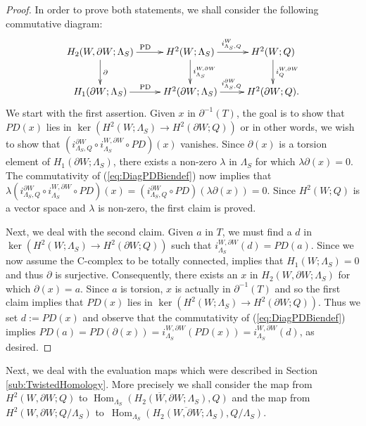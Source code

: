 \documentclass[11pt,a4paper]{amsart}
\theoremstyle{definition}
\DeclareMathOperator{\Hom}{Hom}
\begin{document}
\begin{proof}
In order to prove both statements, we shall consider the following commutative diagram:
\begin{equation}
\label{eq:DiagPDBiendef}
\xymatrix{
H_2(W,\partial W;\Lambda_S) \ar[r]^{\text{PD}} \ar[d]^{\partial}& H^2(W;\Lambda_S) \ar[r]^{i^W_{\Lambda_S,Q}}\ar[d]^{i_{\Lambda_S}^{W,\partial W}}& H^2(W;Q) \ar[d]^{i_Q^{W,\partial W}} \\
H_1(\partial W;\Lambda_S) \ar[r]^{\text{PD}} & H^2(\partial W;\Lambda_S) \ar[r]^{i^{\partial W}_{\Lambda_S,Q}}& H^2(\partial W;Q). \\
}
\end{equation}
We start with the first assertion. Given $x$ in $\partial^{-1}(T)$, the goal is to show that $PD(x)$ lies in $\ker(H^2(W;\Lambda_S) \to H^2(\partial W;Q))$ or in other words, we wish to show that $(i^{\partial W}_{\Lambda_S,Q} \circ  i_{\Lambda_S}^{W,\partial W} \circ PD)(x)$ vanishes. Since $\partial (x)$ is a torsion element of $H_1(\partial W;\Lambda_S)$, there exists a non-zero $\lambda$ in $\Lambda_S$ for which $\lambda \partial (x)=0$. The commutativity of (\ref{eq:DiagPDBiendef}) now implies that $\lambda (i^{\partial W}_{\Lambda_S,Q} \circ i_{\Lambda_S}^{W,\partial W} \circ PD)(x)=(i^{\partial W}_{\Lambda_S,Q} \circ PD)(\lambda \partial( x))=0$. Since $H^2(W;Q)$ is a vector space and $\lambda$ is non-zero, the first claim is proved.

Next, we deal with the second claim. Given $a$ in $T$, we must find a $d$ in $\ker(H^2(W;\Lambda_S) \to H^2(\partial W;Q))$ such that $i_{\Lambda_S}^{W,\partial W}(d)=PD(a)$. Since we now assume the C-complex to be totally connected, \cite[Corollary 3.2]{ConwayFriedlToffoli} implies that $H_1(W;\Lambda_S)=0$ and thus $\partial$ is surjective. Consequently, there exists an $x$ in $H_2(W,\partial W;\Lambda_S)$ for which $\partial (x)=a$. Since $a$ is torsion, $x$ is actually in $\partial^{-1}(T)$ and so the first claim implies that $PD(x)$ lies in $\ker(H^2(W;\Lambda_S) \to H^2(\partial W;Q))$. Thus we set $d:=PD(x)$ and observe that the commutativity of (\ref{eq:DiagPDBiendef}) implies $PD(a)=PD(\partial(x))=i_{\Lambda_S}^{W,\partial W}(PD(x))=i_{\Lambda_S}^{W,\partial W} (d)$, as desired.
\end{proof}

Next, we deal with the evaluation maps which were described in Section \ref{sub:TwistedHomology}. More precisely we shall consider the map from $H^2(W,\partial W;Q)$ to $ \overline{ \Hom_{\Lambda_S}(H_2(W,\partial W;\Lambda_S),Q) }$ and the map from $H^2(W,\partial W;Q/ \Lambda_S)$ to~$\overline{ \Hom_{\Lambda_S}(H_2(W,\partial W;\Lambda_S),Q/ \Lambda_S) }$.
\end{document}
